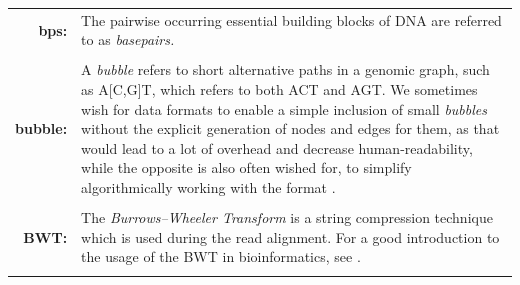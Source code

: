 \documentclass[a4paper,12pt,twoside,BCOR=10mm]{scrbook}
\begin{document}


\begin{tabular}{r p{12cm}}


\textbf{bps: } &
The pairwise occurring essential building blocks of DNA are referred to as \textit{basepairs.}
\\ \\

\textbf{bubble: } &
A \textit{bubble} refers to short alternative paths in a genomic graph, such as 
A[C,G]T, which refers to both ACT and AGT. 
We sometimes wish for data formats to enable a simple inclusion of small \textit{bubbles} without 
the explicit generation of nodes and edges for them, 
as that would lead to a lot of overhead and decrease human-readability, 
while the opposite is also often wished for,
to simplify algorithmically working with the format \citep{specGFA1}.
\\ \\

\textbf{BWT: } &
The \textit{Burrows--Wheeler Transform} is a string compression technique \citep{Burrows1994} 
which is used during the read alignment. For a good introduction to the usage of the BWT 
in bioinformatics, see \citet[chapter 7]{bioinfoalgorithms}.
\\ \\


\end{tabular}
\end{document}
